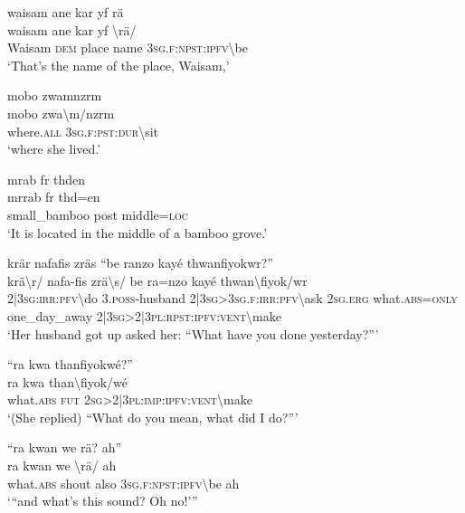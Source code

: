 \ea\label{ex:7:a4815}
waisam ane kar yf rä\\
\gll waisam	ane	kar	yf	{\textbackslash}rä/\\
     Waisam	\textsc{dem}	place	name	3\textsc{sg}.\textsc{f}:\textsc{npst}:\textsc{ipfv}{\textbackslash}be\\
\glt `That's the name of the place, Waisam,'
\z

\ea\label{ex:7:a4816}
mobo zwamnzrm\\
\gll mobo	zwa{\textbackslash}m/nzrm\\
     where.\textsc{all}	3\textsc{sg}.\textsc{f}:\textsc{pst}:\textsc{dur}{\textbackslash}sit\\
\glt `where she lived.'
\z

\ea\label{ex:7:a4817}
mrab fr thden\\
\gll mrrab	fr	thd=en\\
     small\_bamboo	post	middle=\textsc{loc}\\
\glt `It is located in the middle of a bamboo grove.'
\z

\ea\label{ex:7:a4818}
krär nafafis zräs ``be ranzo kayé thwanfiyokwr?''\\
\gll krä{\textbackslash}r/	nafa-fis	zrä{\textbackslash}s/	be	ra=nzo	kayé	thwan{\textbackslash}fiyok/wr\\
     2|3\textsc{sg}:\textsc{irr}:\textsc{pfv}{\textbackslash}do	3.\textsc{poss}-husband	2|3\textsc{sg}>3\textsc{sg}.\textsc{f}:\textsc{irr}:\textsc{pfv}{\textbackslash}ask	2\textsc{sg}.\textsc{erg}	what.\textsc{abs}=\textsc{only}	one\_day\_away	2|3\textsc{sg}>2|3\textsc{pl}:\textsc{rpst}:\textsc{ipfv}:\textsc{vent}{\textbackslash}make\\
\glt `Her husband got up asked her: ``What have you done yesterday?'''
\z

\ea\label{ex:7:a4820}
``ra kwa thanfiyokwé?''\\
\gll ra	kwa	than{\textbackslash}fiyok/wé\\
     what.\textsc{abs}	\textsc{fut}	2\textsc{sg}>2|3\textsc{pl}:\textsc{imp}:\textsc{ipfv}:\textsc{vent}{\textbackslash}make\\
\glt `(She replied) ``What do you mean, what did I do?'''
\z

\ea\label{ex:7:a4821}
``ra kwan we rä? ah''\\
\gll ra	kwan	we	{\textbackslash}rä/	ah\\
     what.\textsc{abs}	shout	also	3\textsc{sg}.\textsc{f}:\textsc{npst}:\textsc{ipfv}{\textbackslash}be	ah\\
\glt `{``}and what's this sound? Oh no!'''
\z

